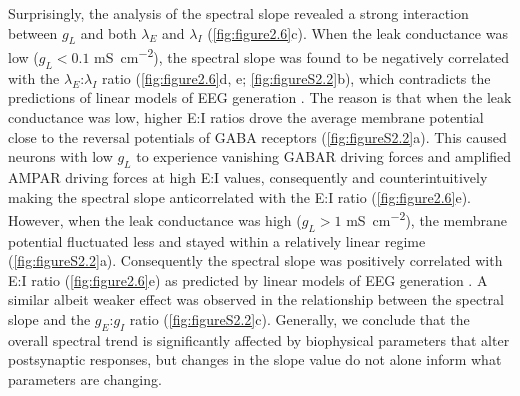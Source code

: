 Surprisingly, the analysis of the spectral slope revealed a strong interaction between $g_L$ and both $\lambda_E$ and $\lambda_I$ (\autoref{fig:figure2.6}c). When the leak conductance was low ($g_L<0.1$ \unit{\milli\siemens\per\centi\meter\squared}), the spectral slope was found to be negatively correlated with the $\lambda_E$:$\lambda_I$ ratio (\autoref{fig:figure2.6}d, e; \autoref{fig:figureS2.2}b), which contradicts the predictions of linear models of EEG generation \cite{Gao2017}. The reason is that when the leak conductance was low, higher E:I ratios drove the average membrane potential close to the reversal potentials of GABA receptors (\autoref{fig:figureS2.2}a). This caused neurons with low $g_L$ to experience vanishing GABAR driving forces and amplified AMPAR driving forces at high E:I values, consequently and counterintuitively making the spectral slope anticorrelated with the E:I ratio (\autoref{fig:figure2.6}e). However, when the leak conductance was high ($g_L>1$ \unit{\milli\siemens\per\centi\meter\squared}), the membrane potential fluctuated less and stayed within a relatively linear regime (\autoref{fig:figureS2.2}a). Consequently the spectral slope was positively correlated with E:I ratio (\autoref{fig:figure2.6}e) as predicted by linear models of EEG generation \cite{Gao2017}. A similar albeit weaker effect was observed in the relationship between the spectral slope and the $g_E$:$g_I$ ratio (\autoref{fig:figureS2.2}c). Generally, we conclude that the overall spectral trend is significantly affected by biophysical parameters that alter postsynaptic responses, but changes in the slope value do not alone inform what parameters are changing.

